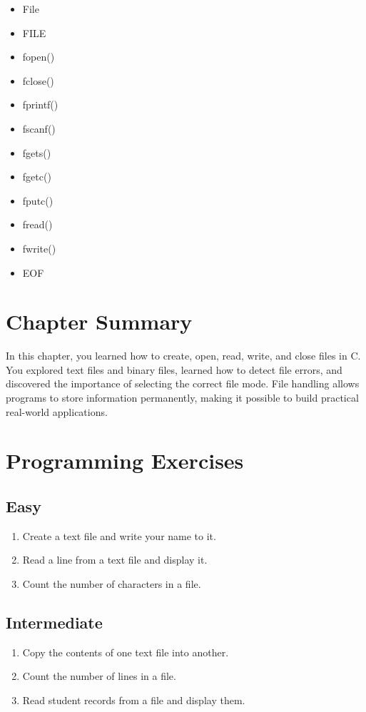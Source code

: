\documentclass[12pt,openany]{book}
\begin{document}
\begin{itemize}
    \item File
    \item FILE
    \item fopen()
    \item fclose()
    \item fprintf()
    \item fscanf()
    \item fgets()
    \item fgetc()
    \item fputc()
    \item fread()
    \item fwrite()
    \item EOF
\end{itemize}

\section{Chapter Summary}

In this chapter, you learned how to create, open, read, write, and close files in C. You explored text files and binary files, learned how to detect file errors, and discovered the importance of selecting the correct file mode. File handling allows programs to store information permanently, making it possible to build practical real-world applications.

\section{Programming Exercises}

\subsection*{Easy}

\begin{enumerate}
    \item Create a text file and write your name to it.
    \item Read a line from a text file and display it.
    \item Count the number of characters in a file.
\end{enumerate}

\subsection*{Intermediate}

\begin{enumerate}
    \item Copy the contents of one text file into another.
    \item Count the number of lines in a file.
    \item Read student records from a file and display them.
\end{enumerate}
\end{document}
